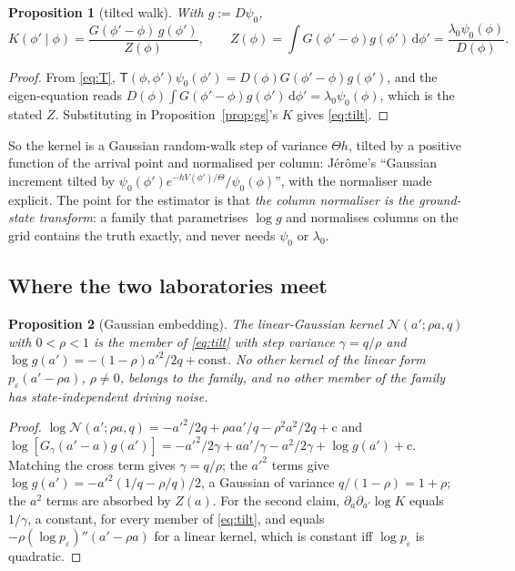 \documentclass[10pt,a4paper]{article}
\newcommand{\Th}{\Theta}
\newcommand{\dd}{\,\mathrm{d}}
\newcommand{\Nn}{\mathcal{N}}
\theoremstyle{plain}
\newtheorem{proposition}{Proposition}
\theoremstyle{remark}
\begin{document}
\begin{proposition}[tilted walk]\label{prop:tilt}
With $g:=D\psi_0$,
\begin{equation}
  K(\phi'\mid\phi)=\frac{G(\phi'-\phi)\,g(\phi')}{Z(\phi)},\qquad
  Z(\phi)=\int G(\phi'-\phi)g(\phi')\dd\phi'=\frac{\lambda_0\psi_0(\phi)}{D(\phi)}.
  \label{eq:tilt}
\end{equation}
\end{proposition}
\begin{proof}
From \eqref{eq:T}, $\mathsf T(\phi,\phi')\psi_0(\phi')=D(\phi)G(\phi'-\phi)g(\phi')$, and the eigen-equation
reads $D(\phi)\int G(\phi'-\phi)g(\phi')\dd\phi'=\lambda_0\psi_0(\phi)$, which is the stated $Z$. Substituting in
Proposition~\ref{prop:gs}'s $K$ gives \eqref{eq:tilt}.
\end{proof}
So the kernel is a Gaussian random-walk step of variance $\Th h$, tilted by a positive function of
the arrival point and normalised per column: Jérôme's ``Gaussian increment tilted by
$\psi_0(\phi')e^{-hV(\phi')/\Th}/\psi_0(\phi)$'', with the normaliser made explicit. The point for the
estimator is that \emph{the column normaliser is the ground-state transform}: a family that
parametrises $\log g$ and normalises columns on the grid contains the truth exactly, and never needs
$\psi_0$ or $\lambda_0$.

\subsection{Where the two laboratories meet}

\begin{proposition}[Gaussian embedding]\label{prop:embed}
The linear-Gaussian kernel $\Nn(a';\rho a,q)$ with $0<\rho<1$ is the member of \eqref{eq:tilt} with
step variance $\gamma=q/\rho$ and $\log g(a')=-(1-\rho)a'^2/2q+\mathrm{const}$. No other kernel of
the linear form $p_\varepsilon(a'-\rho a)$, $\rho\neq0$, belongs to the family, and no other member of
the family has state-independent driving noise.
\end{proposition}
\begin{proof}
$\log\Nn(a';\rho a,q)=-a'^2/2q+\rho aa'/q-\rho^2a^2/2q+\mathrm{c}$ and $\log[G_\gamma(a'-a)g(a')]=-a'^2/2\gamma+aa'/\gamma-a^2/2\gamma+\log g(a')+\mathrm c$.
Matching the cross term gives $\gamma=q/\rho$; the $a'^2$ terms give $\log g(a')=-a'^2(1/q-\rho/q)/2$,
a Gaussian of variance $q/(1-\rho)=1+\rho$; the $a^2$ terms are absorbed by $Z(a)$. For the second
claim, $\partial_a\partial_{a'}\log K$ equals $1/\gamma$, a constant, for every member of \eqref{eq:tilt},
and equals $-\rho(\log p_\varepsilon)''(a'-\rho a)$ for a linear kernel, which is constant iff
$\log p_\varepsilon$ is quadratic.
\end{proof}
\end{document}
